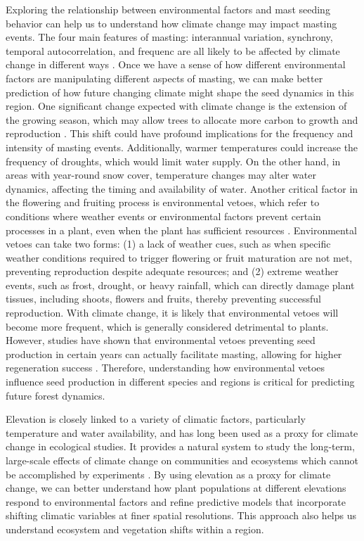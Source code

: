 \documentclass[11pt,letter]{article}
\begin{document}
Exploring the relationship between environmental factors and mast seeding behavior can help us to understand how climate change may impact masting events. The four main features of masting: interannual variation, synchrony, temporal autocorrelation, and frequenc are all likely to be affected by climate change in different ways \citep{hacket2021climate}. Once we have a sense of how different environmental factors are manipulating different aspects of masting, we can make better prediction of how future changing climate might shape the seed dynamics in this region. One significant change expected with climate change is the extension of the growing season, which may allow trees to allocate more carbon to growth and reproduction \citep{keenan2014net}. This shift could have profound implications for the frequency and intensity of masting events. Additionally, warmer temperatures could increase the frequency of droughts, which would limit water supply. On the other hand, in areas with year-round snow cover, temperature changes may alter water dynamics, affecting the timing and availability of water. Another critical factor in the flowering and fruiting process is environmental vetoes, which refer to conditions where weather events or environmental factors prevent certain processes in a plant, even when the plant has sufficient resources \citep{bogdziewicz2022will} . Environmental vetoes can take two forms: (1) a lack of weather cues, such as when specific weather conditions required to trigger flowering or fruit maturation are not met, preventing reproduction despite adequate resources; and (2) extreme weather events, such as frost, drought, or heavy rainfall, which can directly damage plant tissues, including shoots, flowers and fruits, thereby preventing successful reproduction. With climate change, it is likely that environmental vetoes will become more frequent, which is generally considered detrimental to plants. However, studies have shown that environmental vetoes preventing seed production in certain years can actually facilitate masting, allowing for higher regeneration success \citep{bogdziewicz2018correlated, bogdziewicz2019environmental}. Therefore, understanding how environmental vetoes influence seed production in different species and regions is critical for predicting future forest dynamics.\par
Elevation is closely linked to a variety of climatic factors, particularly temperature and water availability, and has long been used as a proxy for climate change in ecological studies. It provides a natural system to study the long-term, large-scale effects of climate change on communities and ecosystems which cannot be accomplished by experiments \citep{sundqvist2013community}. By using elevation as a proxy for climate change, we can better understand how plant populations at different elevations respond to environmental factors and refine predictive models that incorporate shifting climatic variables at finer spatial resolutions. This approach also helps us understand ecosystem and vegetation shifts within a region.\par
\end{document}
